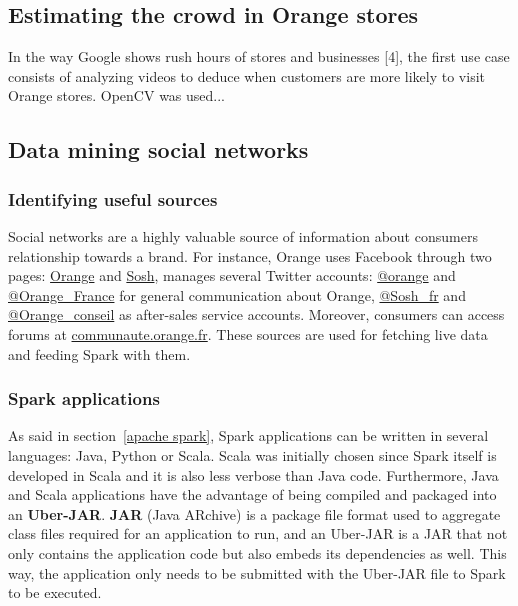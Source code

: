 \documentclass[11pt]{article}
\begin{document}
\subsection{Estimating the crowd in Orange stores}

In the way \textsf{Google} shows rush hours of stores and businesses [4], the first use case consists of analyzing videos to deduce when customers are more likely to visit \textsf{Orange} stores. \textsf{OpenCV} was used...

\subsection{Data mining social networks}

\subsubsection{Identifying useful sources}

Social networks are a highly valuable source of information about consumers relationship towards a brand. For instance, \textsf{Orange} uses \textsf{Facebook} through two pages: \href{https://www.facebook.com/Orange.France/?ref=ts}{\textsf{Orange}} and \href{https://www.facebook.com/sosh/?fref=ts}{\textsf{Sosh}}, manages several \textsf{Twitter} accounts: \href{https://twitter.com/orange}{\textsf{@orange}} and \href{https://twitter.com/Orange_France}{\textsf{@Orange\_France}} for general communication about \textsf{Orange}, \href{https://twitter.com/Sosh_fr}{\textsf{@Sosh\_fr}} and \href{https://twitter.com/Orange_conseil}{\textsf{@Orange\_conseil}} as after-sales service accounts. Moreover, consumers can access forums at \href{https://communaute.orange.fr}{\url{communaute.orange.fr}}. These sources are used for fetching live data and feeding \textsf{Spark} with them.

\subsubsection{Spark applications}

As said in section~\ref{apache spark}, \textsf{Spark} applications can be written in several languages: \textsf{Java}, \textsf{Python} or \textsf{Scala}. \textsf{Scala} was initially chosen since \textsf{Spark} itself is developed in \textsf{Scala} and it is also less verbose than \textsf{Java} code. Furthermore, \textsf{Java} and \textsf{Scala} applications have the advantage of being compiled and packaged into an \textsf{\textbf{Uber-JAR}}. \textsf{\textbf{JAR}} (\textsf{Java} ARchive) is a package file format used to aggregate class files required for an application to run, and an \textsf{Uber-JAR} is a \textsf{JAR} that not only contains the application code but also embeds its dependencies as well. This way, the application only needs to be submitted with the \textsf{Uber-JAR} file to \textsf{Spark} to be executed.
\end{document}
